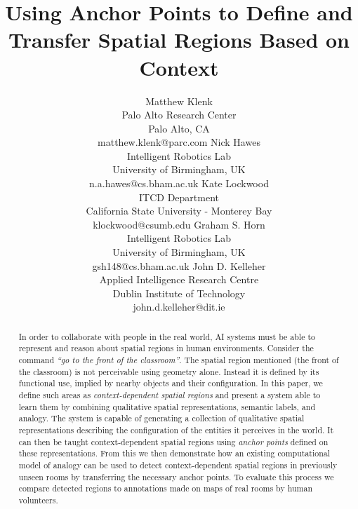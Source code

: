 \documentclass[letterpaper]{article}
\begin{document}
\title{Using Anchor Points to Define and Transfer Spatial Regions Based on Context}

\author{%
Matthew Klenk \\ Palo Alto Research Center \\  Palo Alto, CA \\ matthew.klenk@parc.com 
\And %
Nick Hawes \\ Intelligent Robotics Lab \\ University of Birmingham, UK \\ n.a.hawes@cs.bham.ac.uk 
\And %
Kate Lockwood \\ ITCD Department \\ California State University - Monterey Bay \\ klockwood@csumb.edu  
\AND %
Graham S. Horn \\ Intelligent Robotics Lab \\ University of Birmingham, UK \\ gsh148@cs.bham.ac.uk 
\And %
John D. Kelleher \\ Applied Intelligence Research Centre \\ Dublin Institute of Technology \\ john.d.kelleher@dit.ie}



\maketitle
\begin{abstract}
In order to collaborate with people in the real world, AI systems must be able to represent and reason about spatial regions in human environments. Consider the command \emph{``go to the front of the classroom''}. The spatial region mentioned (the front of the classroom) is not perceivable using geometry alone. Instead it is defined by its functional use, implied by nearby objects and their configuration. In this paper, we define such areas as \textit{context-dependent spatial regions} and present a system able to learn them by combining qualitative spatial representations, semantic labels, and analogy. The system is capable of generating a collection of qualitative spatial representations describing the configuration of the entities it perceives in the world. It can then be taught context-dependent spatial regions using \textit{anchor points} defined on these representations.  From this we then demonstrate how an existing computational model of analogy can be used to detect context-dependent spatial regions in previously unseen rooms by transferring the necessary anchor points. To evaluate this process we compare detected regions to annotations made on maps of real rooms by human volunteers.
\end{abstract}
\end{document}
